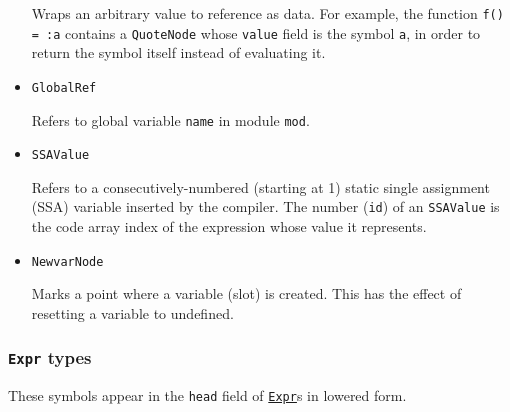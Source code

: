 \begin{itemize}
Wraps an arbitrary value to reference as data. For example, the function \texttt{f() = :a} contains a \texttt{QuoteNode} whose \texttt{value} field is the symbol \texttt{a}, in order to return the symbol itself instead of evaluating it.


\item \texttt{GlobalRef}

Refers to global variable \texttt{name} in module \texttt{mod}.


\item \texttt{SSAValue}

Refers to a consecutively-numbered (starting at 1) static single assignment (SSA) variable inserted by the compiler. The number (\texttt{id}) of an \texttt{SSAValue} is the code array index of the expression whose value it represents.


\item \texttt{NewvarNode}

Marks a point where a variable (slot) is created. This has the effect of resetting a variable to undefined.

\end{itemize}


\hypertarget{15302433068188215381}{}


\subsubsection{\texttt{Expr} types}



These symbols appear in the \texttt{head} field of \hyperlink{17120496304147995299}{\texttt{Expr}}s in lowered form.



